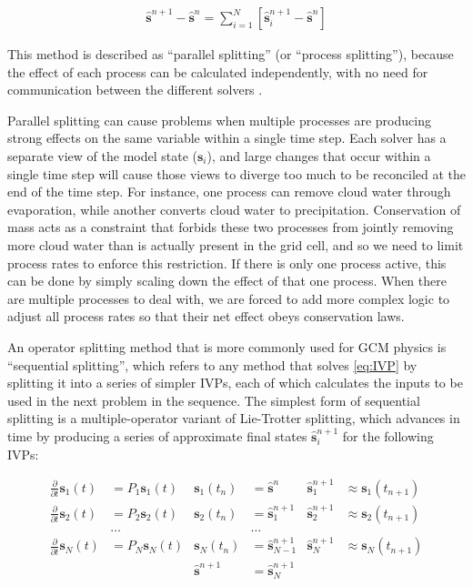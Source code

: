 \documentclass [11pt, proquest] {uwthesis}[2020/02/24]
\begin{document}
\begin{align}
    \hat{\mathbf{s}}^{n+1} - \hat{\mathbf{s}}^n = \sum_{i=1}^{N} \left[\hat{\mathbf{s}}^{n+1}_i - \hat{\mathbf{s}}^n\right]
\end{align}

This method is described as ``parallel splitting'' (or ``process splitting''), because the effect of each process can be calculated independently, with no need for communication between the different solvers \parencite{Beljaars2004}.

Parallel splitting can cause problems when multiple processes are producing strong effects on the same variable within a single time step. Each solver has a separate view of the model state ($\mathbf{s}_i$), and large changes that occur within a single time step will cause those views to diverge too much to be reconciled at the end of the time step. For instance, one process can remove cloud water through evaporation, while another converts cloud water to precipitation. Conservation of mass acts as a constraint that forbids these two processes from jointly removing more cloud water than is actually present in the grid cell, and so we need to limit process rates to enforce this restriction. If there is only one process active, this can be done by simply scaling down the effect of that one process. When there are multiple processes to deal with, we are forced to add more complex logic to adjust all process rates so that their net effect obeys conservation laws.

An operator splitting method that is more commonly used for GCM physics is ``sequential splitting'', which refers to any method that solves \eqref{eq:IVP} by splitting it into a series of simpler IVPs, each of which calculates the inputs to be used in the next problem in the sequence. The simplest form of sequential splitting is a multiple-operator variant of Lie-Trotter splitting, which advances in time by producing a series of approximate final states $\hat{\mathbf{s}}^{n+1}_i$ for the following IVPs:

\begin{align}
    \frac{\partial}{\partial t} \mathbf{s}_1(t) &= P_1 \mathbf{s}_1(t) & \mathbf{s}_1(t_n) &= \hat{\mathbf{s}}^n & \hat{\mathbf{s}}^{n+1}_1 &\approx \mathbf{s}_1(t_{n+1}) \label{eq:IVP-1} \\
    \frac{\partial}{\partial t} \mathbf{s}_2(t) &= P_2 \mathbf{s}_2(t) & \mathbf{s}_2(t_n) &= \hat{\mathbf{s}}^{n+1}_1 & \hat{\mathbf{s}}^{n+1}_2 &\approx \mathbf{s}_2(t_{n+1}) \label{eq:IVP-2} \\
    &\dots & &\dots \nonumber \\
    \frac{\partial}{\partial t} \mathbf{s}_N(t) &= P_N \mathbf{s}_N(t) & \mathbf{s}_N(t_n) &= \hat{\mathbf{s}}^{n+1}_{N-1} & \hat{\mathbf{s}}^{n+1}_N &\approx \mathbf{s}_N(t_{n+1}) \label{eq:IVP-N} \\
    & & \hat{\mathbf{s}}^{n+1} &= \hat{\mathbf{s}}^{n+1}_N & &
\end{align}
\end{document}
